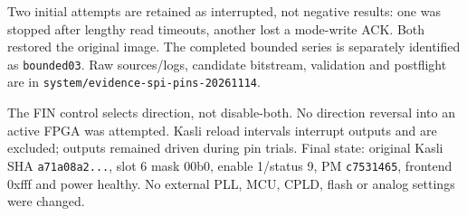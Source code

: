 Two initial attempts are retained as interrupted, not negative results:
one was stopped after lengthy read timeouts, another lost a mode-write ACK.
Both restored the original image. The completed bounded series is separately
identified as \texttt{bounded03}. Raw sources/logs, candidate bitstream,
validation and postflight are in \texttt{system/evidence-spi-pins-20261114}.

The FIN control selects direction, not disable-both. No direction reversal
into an active FPGA was attempted. Kasli reload intervals interrupt outputs
and are excluded; outputs remained driven during pin trials. Final state:
original Kasli SHA \texttt{a71a08a2...}, slot 6 mask 00b0, enable 1/status 9,
PM \texttt{c7531465}, frontend 0xfff and power healthy. No external PLL,
MCU, CPLD, flash or analog settings were changed.
\clearpage
